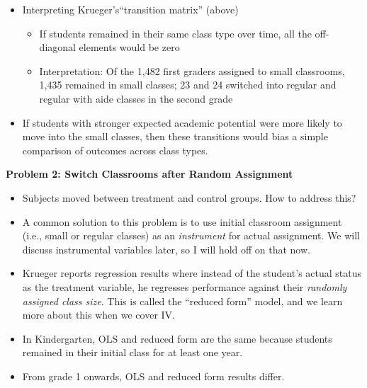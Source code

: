 \documentclass{beamer}
\begin{document}
\begin{frame}[plain]
	\begin{itemize}
	\item Interpreting Krueger's``transition matrix'' (above) 
		\begin{itemize}
		\item If students remained in their same class type over time, all the off-diagonal elements would be zero
		\item Interpretation: Of the 1,482 first graders assigned to small classrooms, 1,435 remained in small classes; 23 and 24 switched into regular and regular with aide classes in the second grade
		\end{itemize}
	\item If students with stronger expected academic potential were more likely to move into the small classes, then these transitions would bias a simple comparison of outcomes across class types.
	\end{itemize}
\end{frame}

\begin{frame}[plain]
	\begin{center}
	\textbf{Problem 2: Switch Classrooms after Random Assignment}
	\end{center}

	\begin{itemize}
	\item Subjects moved between treatment and control groups.  How to address this?
	\item A common solution to this problem is to use initial classroom assignment (i.e., small or regular classes) as an \emph{instrument} for actual assignment.  We will discuss instrumental variables later, so I will hold off on that now.
	\item Krueger reports regression results where instead of the student's actual status as the treatment variable, he regresses performance against their \emph{randomly assigned class size}.  This is called the ``reduced form'' model, and we learn more about this when we cover IV.
	\item In Kindergarten, OLS and reduced form are the same because students remained in their initial class for at least one year.
	\item From grade 1 onwards, OLS and reduced form results differ.
	\end{itemize}
\end{frame}
\end{document}
